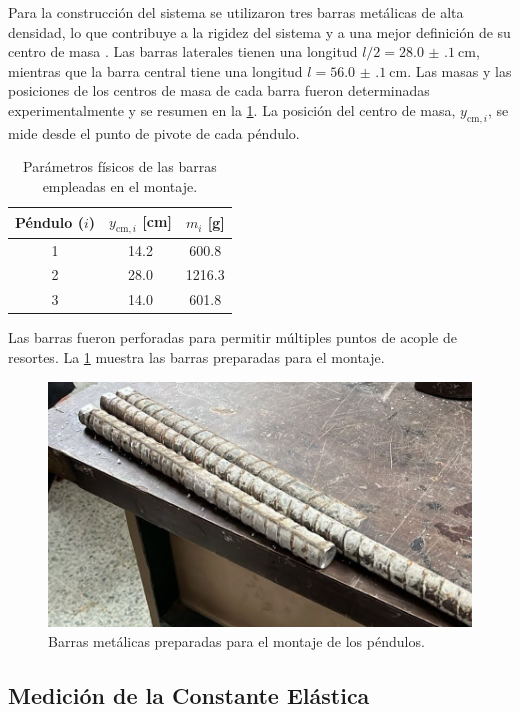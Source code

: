 Para la construcci\'on del sistema se utilizaron tres barras
met\'alicas de alta densidad, lo que contribuye a la rigidez del
sistema y a una mejor definici\'on de su centro de masa
. Las barras laterales tienen una longitud
$l/2 = \qty{28.0(1)}{\centi\metre}$, mientras que la barra central
tiene una longitud $l = \qty{56.0(1)}{\centi\metre}$.
Las masas y las posiciones de los centros de masa de cada barra
fueron determinadas experimentalmente y se resumen en la
\cref{tab:parametros}. La posici\'on del centro de masa,
$y_{\text{cm},i}$, se mide desde el punto de pivote de cada p\'endulo.

\begin{table}[htbp!]
  \centering
  \caption{Par\'ametros f\'isicos de las barras empleadas en el montaje.}
  \label{tab:parametros}
  \begin{tabular}{ccc}
    \toprule
    P\'endulo ($i$) & $y_{\text{cm},i}$ [\si{\centi\metre}] & $m_i$ [\si{\gram}] \\
    \midrule
    1 & 14.2  & 600.8  \\
    2 & 28.0  & 1216.3  \\
    3 & 14.0  & 601.8  \\
    \bottomrule
  \end{tabular}
\end{table}

Las barras fueron perforadas para permitir m\'ultiples puntos de
acople de resortes. La \cref{fig:barras} muestra las barras
preparadas para el montaje.

\begin{figure}[htbp!]
  \centering
  \includegraphics[width=0.6\linewidth]{Figures/metal-bars.jpeg}
  \caption{Barras met\'alicas preparadas para el montaje de los
  p\'endulos.}
  \label{fig:barras}
\end{figure}

\subsection*{Medici\'on de la Constante El\'astica}

